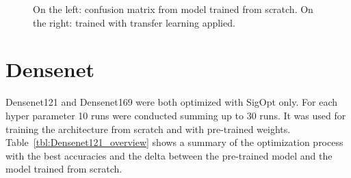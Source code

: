 \begin{figure}[!h]
\centering
\caption{On the left: confusion matrix from model trained from scratch. On the right: trained with transfer learning applied.}
\label{fig:resnet18-cm}
\end{figure}

\quad












\section{Densenet}

Densenet121 and Densenet169 were both optimized with SigOpt only. For each hyper parameter 10 runs were conducted summing up to 30 runs. It was used for training the architecture from scratch and with pre-trained weights. Table~\ref{tbl:Densenet121_overview} shows a summary of the optimization process with the best accuracies and the delta between the pre-trained model and the model trained from scratch.\\


